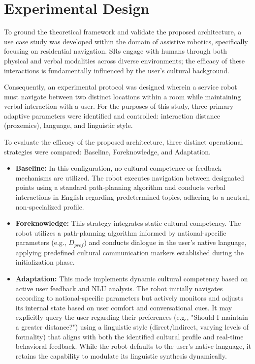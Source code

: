 

\ifpdf
    \graphicspath{{Chapter8/Figs/Raster/}{Chapter8/Figs/PDF/}{Chapter8/Figs/}}
\else
    \graphicspath{{Chapter8/Figs/Vector/}{Chapter8/Figs/}}
\fi

\chapter{Experimental Design}
\label{ch7:sec:exp}

To ground the theoretical framework and validate the proposed architecture, a use case study was developed within the domain of assistive robotics, specifically focusing on residential navigation. 
SRs engage with humans through both physical and verbal modalities across diverse environments; the efficacy of these interactions is fundamentally influenced by the user's cultural background.

Consequently, an experimental protocol was designed wherein a service robot must navigate between two distinct locations within a room while maintaining verbal interaction with a user. 
For the purposes of this study, three primary adaptive parameters were identified and controlled: interaction distance (proxemics), language, and linguistic style.

To evaluate the efficacy of the proposed architecture, three distinct operational strategies were compared: Baseline, Foreknowledge, and Adaptation.

\begin{itemize}
\item \textbf{Baseline:} In this configuration, no cultural competence or feedback mechanisms are utilized. 
The robot executes navigation between designated points using a standard path-planning algorithm and conducts verbal interactions in English regarding predetermined topics, adhering to a neutral, non-specialized profile.

\item \textbf{Foreknowledge:} This strategy integrates static cultural competency. 
The robot utilizes a path-planning algorithm informed by national-specific parameters (e.g., $D_{pref}$) and conducts dialogue in the user's native language, applying predefined cultural communication markers established during the initialization phase.

\item \textbf{Adaptation:} This mode implements dynamic cultural competency based on active user feedback and NLU analysis. 
The robot initially navigates according to national-specific parameters but actively monitors and adjusts its internal state based on user comfort and conversational cues. 
It may explicitly query the user regarding their preferences (e.g., "Should I maintain a greater distance?") using a linguistic style (direct/indirect, varying levels of formality) that aligns with both the identified cultural profile and real-time behavioral feedback.
While the robot defaults to the user's native language, it retains the capability to modulate its linguistic synthesis dynamically.
\end{itemize}


